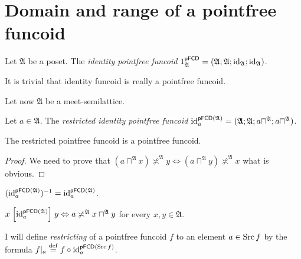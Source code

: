 \section{Domain and range of a pointfree funcoid}
\begin{defn}
Let $\mathfrak{A}$ be a poset.
The \emph{identity pointfree funcoid} $1_{\mathfrak{A}}^{\mathsf{pFCD}}=(\mathfrak{A};\mathfrak{A};\operatorname{id}_{\mathfrak{A}};\operatorname{id}_{\mathfrak{A}})$.
\end{defn}
It is trivial that identity funcoid is really a pointfree funcoid.

Let now $\mathfrak{A}$ be a meet-semilattice.
\begin{defn}
Let $a\in\mathfrak{A}$.
The \emph{restricted identity pointfree funcoid} $\operatorname{id}_{a}^{\mathsf{pFCD}(\mathfrak{A})}=(\mathfrak{A};\mathfrak{A};a\sqcap^{\mathfrak{A}};a\sqcap^{\mathfrak{A}})$.\end{defn}
\begin{prop}
The restricted pointfree funcoid is a pointfree funcoid.\end{prop}
\begin{proof}
We need to prove that $(a\sqcap^{\mathfrak{A}}x)\nasymp^{\mathfrak{A}}y\Leftrightarrow(a\sqcap^{\mathfrak{A}}y)\nasymp^{\mathfrak{A}}x$
what is obvious.\end{proof}
\begin{obvious}
$(\operatorname{id}_{a}^{\mathsf{pFCD}(\mathfrak{A})})^{-1}=\operatorname{id}_{a}^{\mathsf{pFCD}(\mathfrak{A})}$.
\end{obvious}

\begin{obvious}
$x\mathrel{\left[\operatorname{id}_{a}^{\mathsf{pFCD}(\mathfrak{A})}\right]}y\Leftrightarrow a\not\asymp^{\mathfrak{A}}x\sqcap^{\mathfrak{A}}y$
for every $x,y\in\mathfrak{A}$.\end{obvious}
\begin{defn}
I will define \emph{restricting}
of a pointfree funcoid $f$ to an element $a\in\operatorname{Src} f$ by the formula
$f|_{a}\overset{\mathrm{def}}{=} f\circ\operatorname{id}_{a}^{\mathsf{pFCD}(\operatorname{Src} f)}$.
\end{defn}

